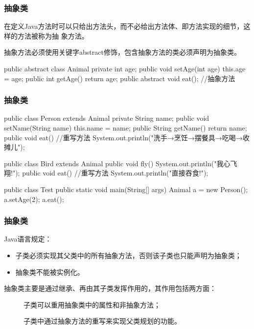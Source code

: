\begin{frame}[fragile] %
\frametitle{抽象类}

在定义Java方法时可以只给出方法头，而不必给出方法体、即方法实现的细节，这样的方法被称为抽
象方法。

抽象方法必须使用关键字abstract修饰，包含抽象方法的类必须声明为抽象类。
\begin{javaCode}
public abstract class Animal {
  private int age;
  public void setAge(int age) {
    this.age = age;
  }
  public int getAge(){
    return age;
  }
  public abstract void eat(); //抽象方法
}
  
\end{javaCode}
\end{frame}

\begin{frame}[fragile] %
\frametitle{抽象类}
\begin{javaCode}
public class Person extends Animal {
  private String name;
  public void setName(String name) {
    this.name = name;
  }
  public String getName() {
    return name;
  }
  public void eat() { //重写方法
    System.out.println("洗手→烹饪→摆餐具→吃喝→收摊儿");
  }
}
\end{javaCode}

\begin{javaCode}
public class Bird extends Animal {
  public void fly(){
    System.out.println("我心飞翔!");
  }
  public void eat(){  //重写方法
    System.out.println("直接吞食!");
  }
}
\end{javaCode}
\begin{javaCode}
public class Test {
  public static void main(String[] args) {
    Animal a = new Person();
    a.setAge(2);
    a.eat();
  }
}
\end{javaCode}
\end{frame}

\begin{frame}[fragile] %
\frametitle{抽象类}

Java语言规定：
\begin{itemize}
\item 子类必须实现其父类中的所有抽象方法，否则该子类也只能声明为抽象类；
\item 抽象类不能被实例化。
\end{itemize}

抽象类主要是通过继承、再由其子类发挥作用的，其作用包括两方面：
\begin{description}
\item[] 子类可以重用抽象类中的属性和非抽象方法；
\item[] 子类中通过抽象方法的重写来实现父类规划的功能。
\end{description}
\end{frame}

